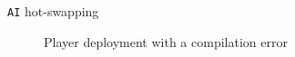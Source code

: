 \documentclass{beamer}
\begin{document}
\begin{frame}{\texttt{AI} hot-swapping}
\begin{figure}[H]
\caption{Player deployment with a compilation error}
\end{figure}
\end{frame}
\end{document}
